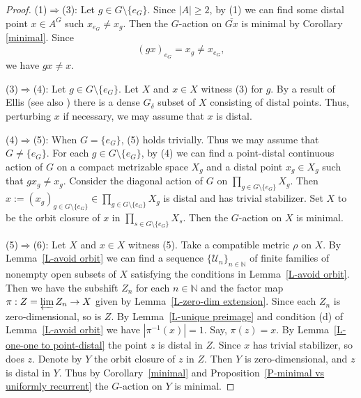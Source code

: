\documentclass[11pt]{amsart}
\theoremstyle{definition}
\numberwithin{equation}{section}
\theoremstyle{definition}
\newcommand{\cU}{{\mathcal U}}
\newcommand{\Nb}{{\mathbb N}}
\begin{document}
\begin{proof} (1)$\Rightarrow$(3): Let $g\in G\setminus \{e_G\}$. Since $|A|\ge 2$, by (1) we can find some distal point $x\in A^G$ such
$x_{e_G}\neq x_g$. Then the $G$-action on $\overline{Gx}$ is minimal by Corollary \ref{minimal}. Since 
$$(gx)_{e_G}=x_g\neq x_{e_G},$$
we have $gx\neq x$. 

(3)$\Rightarrow$(4): Let $g\in G\setminus \{e_G\}$. Let $X$ and $x\in X$ witness (3) for $g$. By a result of Ellis \cite{Ellis73} (see also \cite[VI.6.4.6]{deVries}) there is a dense $G_\delta$ subset of $X$ consisting of distal points. Thus, perturbing $x$ if necessary, we may assume that $x$ is distal. 

(4)$\Rightarrow$(5): When $G=\{e_G\}$, (5) holds trivially. Thus we may assume that $G\neq \{e_G\}$. For each $g\in G\setminus \{e_G\}$, by (4) we can find a point-distal continuous action of $G$ on a compact metrizable space $X_g$ and a distal point $x_g\in X_g$ such that $gx_g\neq x_g$. Consider the diagonal action of $G$ on $\prod_{g\in G\setminus \{e_G\}}X_g$. Then $x:=(x_g)_{g\in G\setminus \{e_G\}}\in \prod_{g\in G\setminus \{e_G\}}X_g$ is distal and has trivial stabilizer.
Set $X$ to be the orbit closure of $x$ in $\prod_{s\in G\setminus \{e_G\}}X_s$. Then the $G$-action on $X$ is minimal.

(5)$\Rightarrow$(6): Let $X$ and $x\in X$ witness (5). Take a compatible metric $\rho$ on $X$. By Lemma~\ref{L-avoid orbit}  we can find a sequence $\{\cU_n\}_{n\in \Nb}$ of finite families of nonempty open subsets of $X$ satisfying the conditions in Lemma~\ref{L-avoid orbit}. Then we have the subshift $Z_n$ for each $n\in \Nb$ and the factor map $\pi: Z=\varprojlim Z_n\rightarrow X$ given by Lemma~\ref{L-zero-dim extension}. Since each $Z_n$ is zero-dimensional, so is $Z$. By Lemma~\ref{L-unique preimage} and condition (d) of Lemma~\ref{L-avoid orbit} we have $|\pi^{-1}(x)|=1$. Say, $\pi(z)=x$. By Lemma~\ref{L-one-one to point-distal} the point $z$ is distal in $Z$. Since $x$ has trivial stabilizer, so does $z$. Denote by $Y$ the orbit closure of $z$ in $Z$. Then $Y$ is zero-dimensional, and $z$ is distal in $Y$. Thus by Corollary~\ref{minimal} and Proposition~\ref{P-minimal vs uniformly recurrent} the $G$-action on $Y$ is minimal. 


\end{proof}
\end{document}
